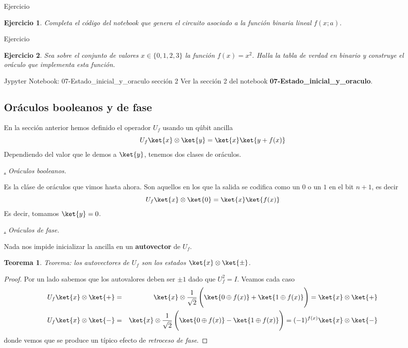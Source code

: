 \documentclass[a4paper,11pt]{book} %
\newtheorem{teorema_contador}{Teorema}
\newcommand{\Teorema}[1]{
		\begin{mybox_gray2}{}
			\begin{teorema_contador}
				 #1 
			\end{teorema_contador} 
		\end{mybox_gray2}
	}
\newtheorem{ejercicio_contador}{Ejercicio}
\newcommand{\Ejercicio}[1]{
		\begin{mybox_gray}{Ejercicio} 
			\begin{ejercicio_contador}
				 #1 
			\end{ejercicio_contador} 
		\end{mybox_gray}
	}
\numberwithin{equation}{chapter}
\def\subsubiContadorIt{\par\addtocounter{subsubsection}{1}\underline{\it\thesubsubsection.}\hskip0.5cm \setcounter{subsubsubsectionIt}{0}}
\newcommand{\SubsubiIt}[1]{
		\subsubiContadorIt \textit{#1}
	}
\newcounter{subsubsubsectionIt}[subsubsection]
\begin{document}
	\Ejercicio{Completa el código del notebook que genera el circuito asociado a la función binaria lineal $f(x;a)$.}
	
	\Ejercicio{Sea sobre el conjunto de valores $x\in \{0,1,2,3\}$ la función $f(x) = x^2$. Halla la tabla de verdad 
	en binario y construye el oráculo que implementa esta función.}



	\begin{mybox_orange}{Jypyter Notebook: 07-Estado\_inicial\_y\_oraculo sección 2}
	Ver la sección 2 del notebook \textbf{07-Estado\_inicial\_y\_oraculo}.
	\end{mybox_orange}
	
    	
    	
    	\subsection{Oráculos booleanos y de fase}

En la sección anterior hemos definido el operador  $U_f$ usando un qúbit ancilla
$$
U_f \ket{x}\otimes\ket{y} = \ket{x}\ket{y + f(x)}
$$
Dependiendo del valor que le demos a $\ket{y}$, tenemos dos clases de oráculos. 


			\SubsubiIt{Oráculos booleanos.}

Es la cláse de oráculos que vimos hasta ahora. Son aquellos en los que la salida se codifica como un $0$ o un $1$ en el bit $n+1$, es decir
$$
U_f \ket{x}\otimes\ket{0} = \ket{x}\ket{f(x)}
$$
Es decir, tomamos $\ket{y} = 0$.

			\SubsubiIt{Oráculos de fase.} 

Nada nos impide inicializar la ancilla en un \textbf{autovector} de $U_f$. 

	\Teorema{Teorema: los autovectores de $U_f$ son los estados $\ket{x}\otimes \ket{\pm}$.}
	
	\begin{proof}
	Por un lado sabemos que los autovalores deben ser $\pm 1$ dado que $U_f^2 = I$. Veamos cada caso
	\begin{eqnarray}
	U_f\ket{x}\otimes \ket{+} &=& \ket{x}\otimes \frac{1}{\sqrt{2}}\left( \rule{0mm}{6mm}\ket{0\oplus f(x)}+\ket{1\oplus f(x)} \right) 
	= 	\ket{x}\otimes \ket{+} \nonumber\\
	U_f\ket{x}\otimes \ket{-} &=& \ket{x}\otimes \frac{1}{\sqrt{2}}\left( \rule{0mm}{6mm} \ket{0\oplus f(x)}-\ket{1\oplus f(x)}\right) 
	= (-1)^{f(x)} \ket{x}\otimes \ket{-} \nonumber
	\end{eqnarray}
	donde vemos que se produce un típico efecto de \textit{retroceso de fase}.
	\end{proof}
\end{document}
